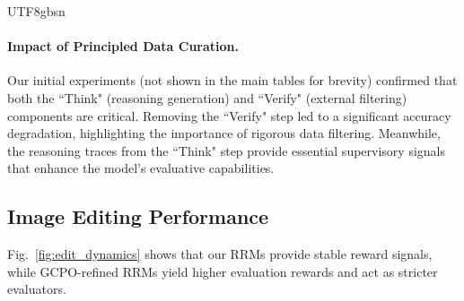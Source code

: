 \documentclass{llmxive}
\begin{document}
\begin{CJK*}{UTF8}{gbsn}
\paragraph{Impact of Principled Data Curation.}
Our initial experiments (not shown in the main tables for brevity) confirmed that both the ``Think" (reasoning generation) and ``Verify" (external filtering) components are critical. Removing the ``Verify" step led to a significant accuracy degradation, highlighting the importance of rigorous data filtering. Meanwhile, the reasoning traces from the ``Think" step provide essential supervisory signals that enhance the model's evaluative capabilities.
\subsection{Image Editing Performance}
Fig.~\ref{fig:edit_dynamics} shows that our RRMs provide stable reward signals, while GCPO-refined RRMs yield higher evaluation rewards and act as stricter evaluators.
\vspace{-.5em}

\end{CJK*}
\end{document}
